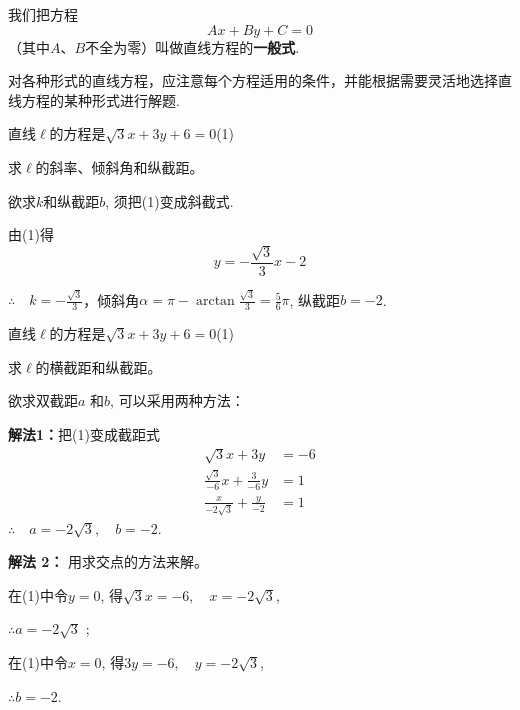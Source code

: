我们把方程
\begin{equation}
    Ax+By+C=0 \tag{7}
\end{equation}
（其中$A$、$B$不全为零）叫做直线方程的\textbf{一般式}.

对各种形式的直线方程，应注意每个方程适用的条件，并能根据需要灵活地选择直线方程的某种形式进行解题.

\begin{example}
直线$\ell$的方程是$\sqrt{3}x+3y+6=0$\hfill (1)

求$\ell$的斜率、倾斜角和纵截距。
\end{example}

\begin{analyze}
    欲求$k$和纵截距$b$, 须把(1)变成斜截式.
\end{analyze}

\begin{solution}
    由(1)得
\begin{equation}
    y=-\frac{\sqrt{3}}3x-2 \tag{2}
\end{equation}

$\therefore\quad k= - \frac {\sqrt {3}}3$，倾斜角$\alpha=\pi-\arctan\frac{\sqrt{3}}{3}=\frac{5}{6}\pi$, 
纵截距$b=-2$.
\end{solution}

\begin{example}
    直线$\ell$的方程是$\sqrt3x+3y+6=0$\hfill (1)

求$\ell$的横截距和纵截距。
\end{example}

\begin{analyze}
    欲求双截距$a$ 和$b$, 可以采用两种方法：
\end{analyze}

\begin{solution}
\textbf{解法1：}把(1)变成截距式
\[\begin{split}
    \sqrt{3}x+3y&=-6\\
    \frac{\sqrt{3}}{-6}x+\frac{3}{-6}y&=1\\
\frac{x}{-2\sqrt{3}}+\frac{y}{-2}&=1
\end{split}\]
$\therefore\quad a= - 2\sqrt {3},\quad b=-2$.    

\textbf{解法 2：} 用求交点的方法来解。

在(1)中令$y=0$, 得$\sqrt{3} x=-6,\quad  x=-2 \sqrt{3}$,

$\therefore a= - 2\sqrt {3}$ ;    

在(1)中令$x=0$, 得$3y=-6,\quad  y=-2 \sqrt{3}$,

$\therefore b= - 2$.    
\end{solution}

